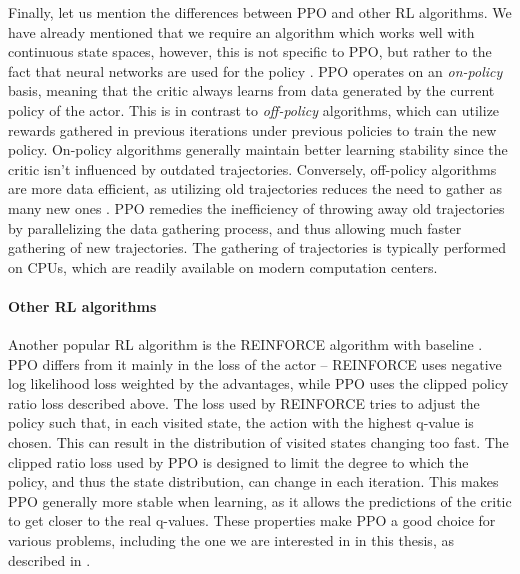 Finally, let us mention the differences between PPO and other RL algorithms.
We have already mentioned that we require an algorithm which works well with continuous state spaces, however, this is not specific to PPO, but rather to the fact that neural networks are used for the policy \citep{journals/nature/MnihKSRVBGRFOPB15}.
PPO operates on an \emph{on-policy} basis, meaning that the critic always learns from data generated by the current policy of the actor.
This is in contrast to \emph{off-policy} algorithms, which can utilize rewards gathered in previous iterations under previous policies to train the new policy.
On-policy algorithms generally maintain better learning stability since the critic isn't influenced by outdated trajectories.
Conversely, off-policy algorithms are more data efficient, as utilizing old trajectories reduces the need to gather as many new ones \citep{LYU2024120371}.
PPO remedies the inefficiency of throwing away old trajectories by parallelizing the data gathering process, and thus allowing much faster gathering of new trajectories.
The gathering of trajectories is typically performed on CPUs, which are readily available on modern computation centers.

\paragraph{Other RL algorithms}
Another popular RL algorithm is the REINFORCE algorithm with baseline \cite[][Chapter 13]{sutton2018reinforcement}.
PPO differs from it mainly in the loss of the actor -- REINFORCE uses negative log likelihood loss weighted by the advantages, while PPO uses the clipped policy ratio loss described above.
The loss used by REINFORCE tries to adjust the policy such that, in each visited state, the action with the highest q-value is chosen.
This can result in the distribution of visited states changing too fast.
The clipped ratio loss used by PPO is designed to limit the degree to which the policy, and thus the state distribution, can change in each iteration.
This makes PPO generally more stable when learning, as it allows the predictions of the critic to get closer to the real q-values.
These properties make PPO a good choice for various problems, including the one we are interested in in this thesis, as described in .
